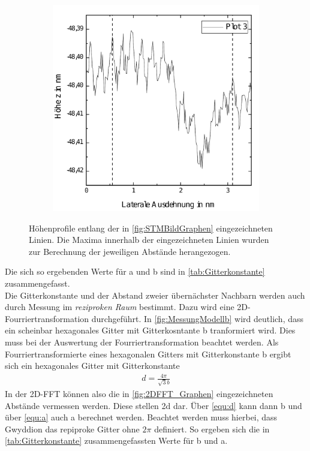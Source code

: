\documentclass[a4paper,twoside,final]{article}
\begin{document}
\begin{figure}[htp]
\begin{subfigure}{0.3\textwidth}
        \caption{ }
    \end{subfigure}
    \hspace{0.5cm}
    \begin{subfigure}{0.3\textwidth}
        \includegraphics[width=\textwidth]{Bilder/Graphen_Profil3.pdf}
        \caption{ }
    \end{subfigure}
    \caption{Höhenprofile entlang der in \ref{fig:STMBildGraphen} eingezeichneten Linien. Die Maxima innerhalb der eingezeichneten Linien wurden zur Berechnung der jeweiligen Abstände herangezogen.}
    \label{fig:HöhenprofileGraphen}
\end{figure}
Die sich so ergebenden Werte für a und b sind in \ref{tab:Gitterkonstante} zusammengefasst. \\


Die Gitterkonstante und der Abstand zweier übernächster Nachbarn werden auch durch Messung im \textit{reziproken Raum} bestimmt. Dazu wird eine 2D-Fourriertransformation durchgeführt. In \ref{fig:MessungModellb} wird deutlich, dass ein scheinbar hexagonales Gitter mit Gitterkosntante b tranformiert wird. Dies muss bei der Auswertung der Fourriertransformation beachtet werden. Als Fourriertransformierte eines hexagonalen Gitters mit Gitterkonstante b ergibt sich ein hexagonales Gitter mit Gitterkonstante
\begin{align}\label{equ:d}
  d = \frac{4\pi}{\sqrt{3}b}
\end{align}
In der 2D-FFT können also die in \ref{fig:2DFFT_Graphen} eingezeichneten Abstände vermessen werden. Diese stellen 2d dar. Über \ref{equ:d} kann dann b und über \ref{equ:a} auch a berechnet werden. Beachtet werden muss hierbei, dass Gwyddion das repiproke Gitter ohne $2\pi$ definiert. So ergeben sich die in \ref{tab:Gitterkonstante} zusammengefassten Werte für b und a.
\end{document}
